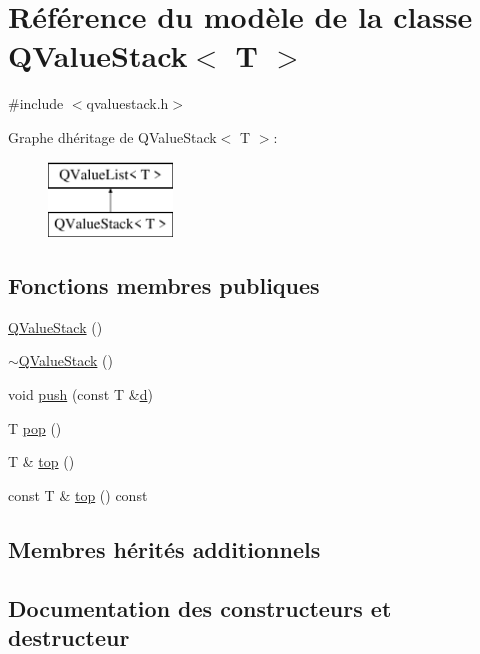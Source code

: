 \hypertarget{class_q_value_stack}{}\section{Référence du modèle de la classe Q\+Value\+Stack$<$ T $>$}
\label{class_q_value_stack}


{\ttfamily \#include $<$qvaluestack.\+h$>$}

Graphe d\textquotesingle{}héritage de Q\+Value\+Stack$<$ T $>$\+:\begin{figure}[H]
\begin{center}
\leavevmode
\includegraphics[height=2.000000cm]{class_q_value_stack}
\end{center}
\end{figure}
\subsection*{Fonctions membres publiques}
\begin{DoxyCompactItemize}
\item 
\hyperlink{class_q_value_stack_a560d998592b827ce350bbf2855f4eeb8}{Q\+Value\+Stack} ()
\item 
\hyperlink{class_q_value_stack_a6d015979d40001f64b70395e87d66c04}{$\sim$\+Q\+Value\+Stack} ()
\item 
void \hyperlink{class_q_value_stack_a2b0e467a293ab39dcc488d4ea21de51f}{push} (const T \&\hyperlink{060__command__switch_8tcl_af43f4b1f0064a33b2d662af9f06d3a00}{d})
\item 
T \hyperlink{class_q_value_stack_a17ceddf08b4761a39f5b85e4035a2fbb}{pop} ()
\item 
T \& \hyperlink{class_q_value_stack_a14f13973339e3188b8ef328ce65bb91f}{top} ()
\item 
const T \& \hyperlink{class_q_value_stack_a943af1b06057f2d9685c56c532536746}{top} () const 
\end{DoxyCompactItemize}
\subsection*{Membres hérités additionnels}


\subsection{Documentation des constructeurs et destructeur}
\hypertarget{class_q_value_stack_a560d998592b827ce350bbf2855f4eeb8}{}
